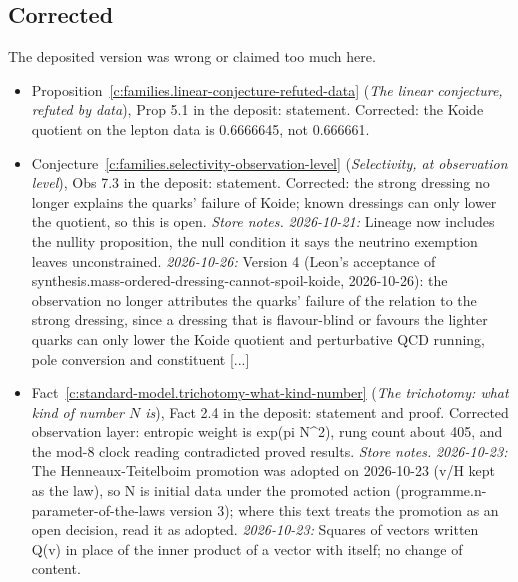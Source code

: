 \documentclass[11pt]{article}
\theoremstyle{definition}
\theoremstyle{plain}
\begin{document}
\subsection*{Corrected}
The deposited version was wrong or claimed too much here.
\begin{itemize}\setlength{\itemsep}{2pt}
\item Proposition~\ref{c:families.linear-conjecture-refuted-data} (\emph{The linear conjecture, refuted by data}), Prop 5.1 in the deposit: statement. Corrected: the Koide quotient on the lepton data is 0.6666645, not 0.666661.
\item Conjecture~\ref{c:families.selectivity-observation-level} (\emph{Selectivity, at observation level}), Obs 7.3 in the deposit: statement. Corrected: the strong dressing no longer explains the quarks' failure of Koide; known dressings can only lower the quotient, so this is open. \emph{Store notes.} \emph{2026-10-21:} Lineage now includes the nullity proposition, the null condition it says the neutrino exemption leaves unconstrained. \emph{2026-10-26:} Version 4 (Leon's acceptance of synthesis.mass-ordered-dressing-cannot-spoil-koide, 2026-10-26): the observation no longer attributes the quarks' failure of the relation to the strong dressing, since a dressing that is flavour-blind or favours the lighter quarks can only lower the Koide quotient and perturbative QCD running, pole conversion and constituent [...]
\item Fact~\ref{c:standard-model.trichotomy-what-kind-number} (\emph{The trichotomy: what kind of number $N$ is}), Fact 2.4 in the deposit: statement and proof. Corrected observation layer: entropic weight is exp(pi N\^{}2), rung count about 405, and the mod-8 clock reading contradicted proved results. \emph{Store notes.} \emph{2026-10-23:} The Henneaux-Teitelboim promotion was adopted on 2026-10-23 (v/H kept as the law), so N is initial data under the promoted action (programme.n-parameter-of-the-laws version 3); where this text treats the promotion as an open decision, read it as adopted. \emph{2026-10-23:} Squares of vectors written Q(v) in place of the inner product of a vector with itself; no change of content.
\end{itemize}
\end{document}
